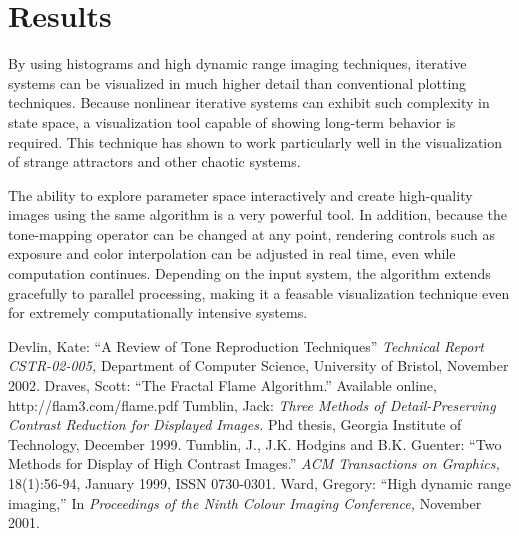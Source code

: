 \documentclass[letterpaper, 11pt]{article}
\begin{document}
\section{Results}
By using histograms and high dynamic range imaging techniques, iterative systems can be
visualized in much higher detail than conventional plotting techniques.  Because
nonlinear iterative systems can exhibit such complexity in state space, a visualization
tool capable of showing long-term behavior is required. This technique has shown to
work particularly well in the visualization of strange attractors and other chaotic
systems.

The ability to explore parameter space interactively and create high-quality images
using the same algorithm is a very powerful tool.  In addition, because the tone-mapping
operator can be changed at any point, rendering controls such as exposure and color
interpolation can be adjusted in real time, even while computation continues. Depending
on the input system, the algorithm extends gracefully to parallel processing, making
it a feasable visualization technique even for extremely computationally intensive
systems.

\begin{thebibliography}{77}
 Devlin, Kate: ``A Review of Tone Reproduction Techniques'' {\it Technical Report CSTR-02-005,} Department of Computer Science, University of Bristol, November 2002.
 Draves, Scott: ``The Fractal Flame Algorithm.'' Available online, http://flam3.com/flame.pdf
 Tumblin, Jack: {\it Three Methods of Detail-Preserving Contrast Reduction for Displayed Images.} Phd thesis, Georgia Institute of Technology, December 1999.
 Tumblin, J., J.K. Hodgins and B.K. Guenter: ``Two Methods for Display of High Contrast Images.'' {\it ACM Transactions on Graphics,} 18(1):56-94, January 1999, ISSN 0730-0301.
 Ward, Gregory: ``High dynamic range imaging,'' In {\it Proceedings of the Ninth Colour Imaging Conference,} November 2001.
\end{thebibliography}
\end{document}
